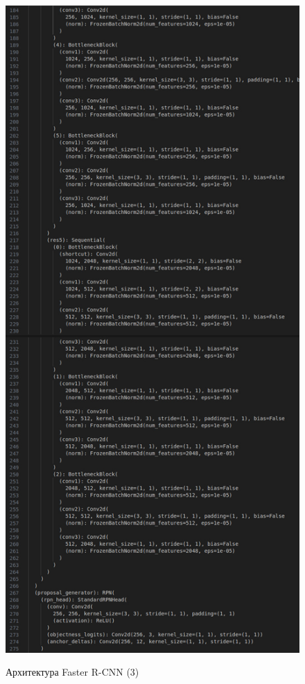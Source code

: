 \begin{figure}[h!]
    \begin{center}
	\includegraphics [scale=0.35]{my_folder/images/arch56}
	\label{fig:arch56}
	\end{center}
	\caption{Архитектура Faster R-CNN (3)}
\end{figure}

